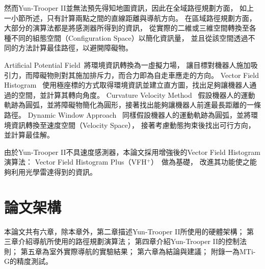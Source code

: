 然而Yun-Trooper II並無法預先得知地圖資訊，因此在全域路徑規劃方面，
如上一小節所述，只有計算兩點之間的直線距離與導航方向。
在區域路徑規劃方面，大部分的演算法都是將感測器所得到的資訊，
從實際的二維或三維空間轉換至各種不同的組態空間（Configuration Space）以簡化資訊量，
並且從該空間透過不同的方法計算最佳路徑，以避開障礙物。

Artificial Potential Field~\cite{Khatib:1985:APF}將環境資訊轉換為一虛擬力場，
讓目標對機器人施加吸引力，而障礙物則對其施加排斥力，而合力即為自走車應走的方向。
Vector Field Histogram~\cite{Borenstein:1991:VFH}
使用極座標的方式取得環境資訊並建立直方圖，找出足夠讓機器人通過的空間，並計算其轉向角度。
Curvature Velocity Method~\cite{Simmons:1996:CVM}
假設機器人的運動軌跡為圓弧，並將障礙物簡化為圓形，接著找出能夠讓機器人前進最長距離的一條路徑。
Dynamic Window Approach~\cite{Thrun:1997:DW}
同樣假設機器人的運動軌跡為圓弧，並將環境資訊轉換至速度空間（Velocity Space），
接著考慮動態拘束後找出可行方向，並計算最佳解。

由於Yun-Trooper II不具速度感測器，本論文採用增強後的Vector Field Histogram演算法：
Vector Field Histogram Plus（VFH$^+$）~\cite{Ulrich:1998:VFHPlus}做為基礎，
改進其功能使之能夠利用光學雷達得到的資訊。

\section{論文架構}
本論文共有六章，除本章外，第二章描述Yun-Trooper II所使用的硬體架構；
第三章介紹導航所使用的路徑規劃演算法；
第四章介紹Yun-Trooper II的控制法則；
第五章為室外實際導航的實驗結果；
第六章為結論與建議；
附錄一為MTi-G的精度測試。


